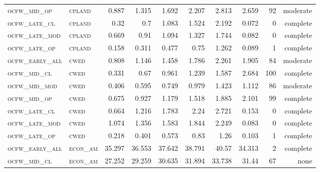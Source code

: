 \begin{landscape}
\begin{center}
\begin{footnotesize}
\begin{longtable}{llrrrrr|rrr}
\textsc{ocfw\_mid\_op   } & \textsc{cpland    }    & 0.887    & 1.315    & 1.692    & 2.207    & 2.813      & 2.659         & 92            & moderate        \\
\textsc{ocfw\_late\_cl  } & \textsc{cpland    }    & 0.32     & 0.7      & 1.083    & 1.524    & 2.192      & 0.072         & 0             & complete            \\
\textsc{ocfw\_late\_mod } & \textsc{cpland    }    & 0.669    & 0.91     & 1.094    & 1.327    & 1.744      & 0.082         & 0             & complete            \\
\textsc{ocfw\_late\_op  } & \textsc{cpland    }    & 0.158    & 0.311    & 0.477    & 0.75     & 1.262      & 0.089         & 1             & complete        \\
\textsc{ocfw\_early\_all} & \textsc{cwed      }    & 0.808    & 1.146    & 1.458    & 1.786    & 2.261      & 1.905         & 84            & moderate        \\
\textsc{ocfw\_mid\_cl   } & \textsc{cwed      }    & 0.331    & 0.67     & 0.961    & 1.239    & 1.587      & 2.684         & 100           & complete             \\
\textsc{ocfw\_mid\_mod  } & \textsc{cwed      }    & 0.406    & 0.595    & 0.749    & 0.979    & 1.423      & 1.112         & 86            & moderate        \\
\textsc{ocfw\_mid\_op   } & \textsc{cwed      }    & 0.675    & 0.927    & 1.179    & 1.518    & 1.885      & 2.101         & 99            & complete        \\
\textsc{ocfw\_late\_cl  } & \textsc{cwed      }    & 0.664    & 1.216    & 1.783    & 2.24     & 2.721      & 0.153         & 0             & complete            \\
\textsc{ocfw\_late\_mod } & \textsc{cwed      }    & 1.074    & 1.356    & 1.583    & 1.844    & 2.249      & 0.083         & 0             & complete            \\
\textsc{ocfw\_late\_op  } & \textsc{cwed      }    & 0.218    & 0.401    & 0.573    & 0.83     & 1.26       & 0.103         & 1             & complete        \\
\textsc{ocfw\_early\_all} & \textsc{econ\_am  }    & 35.297   & 36.553   & 37.642   & 38.791   & 40.57      & 34.313        & 2             & complete        \\
\textsc{ocfw\_mid\_cl   } & \textsc{econ\_am  }    & 27.252   & 29.259   & 30.635   & 31.894   & 33.738     & 31.44         & 67            & none        \\

\end{longtable}
\end{footnotesize}
\end{center}
\end{landscape}
